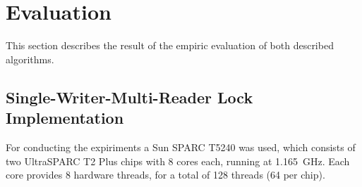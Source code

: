 
\section{Evaluation}

This section describes the result of the empiric evaluation of both described algorithms.

\subsection{Single-Writer-Multi-Reader Lock Implementation}

For conducting the expiriments a Sun SPARC T5240 was used, which consists of two UltraSPARC T2 Plus chips with 8 cores each, running at 1.165~GHz. Each core provides 8 hardware threads, for a total of 128 threads (64 per chip).


